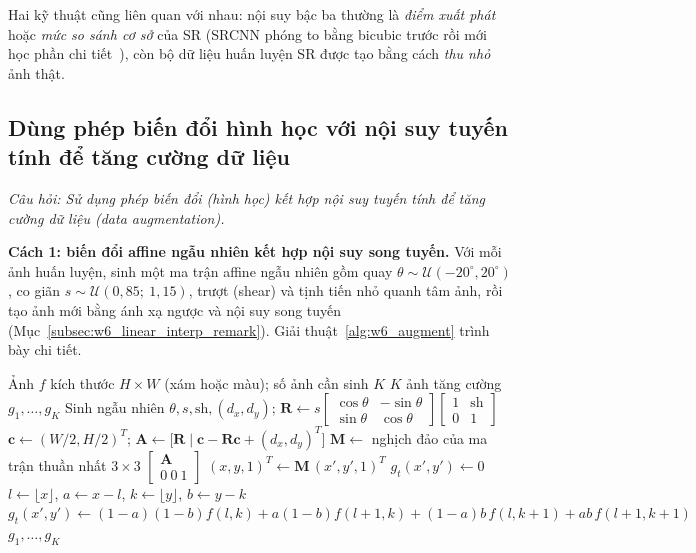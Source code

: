 Hai kỹ thuật cũng liên quan với nhau: nội suy bậc ba thường là \emph{điểm xuất phát} hoặc \emph{mức so sánh cơ sở} của SR (SRCNN phóng to bằng bicubic trước rồi mới học phần chi tiết~\citep{dong2016image}), còn bộ dữ liệu huấn luyện SR được tạo bằng cách \emph{thu nhỏ} ảnh thật.

\subsection{Dùng phép biến đổi hình học với nội suy tuyến tính để tăng cường dữ liệu}
\label{subsec:w6_augment_interp}

\textit{Câu hỏi: Sử dụng phép biến đổi (hình học) kết hợp nội suy tuyến tính để tăng cường dữ liệu (data augmentation).}

\textbf{Cách 1: biến đổi affine ngẫu nhiên kết hợp nội suy song tuyến.} Với mỗi ảnh huấn luyện, sinh một ma trận affine ngẫu nhiên gồm quay $\theta \sim \mathcal{U}(-20^\circ, 20^\circ)$, co giãn $s \sim \mathcal{U}(0{,}85;\ 1{,}15)$, trượt (shear) và tịnh tiến nhỏ quanh tâm ảnh, rồi tạo ảnh mới bằng ánh xạ ngược và nội suy song tuyến (Mục~\ref{subsec:w6_linear_interp_remark}). Giải thuật~\ref{alg:w6_augment} trình bày chi tiết.

\begin{algorithm}[ht]
\caption{Tăng cường dữ liệu bằng biến đổi affine ngẫu nhiên và nội suy song tuyến}
\label{alg:w6_augment}
\begin{algorithmic}[1]
\Require Ảnh $f$ kích thước $H \times W$ (xám hoặc màu); số ảnh cần sinh $K$
\Ensure $K$ ảnh tăng cường $g_1, \ldots, g_K$
    \State Sinh ngẫu nhiên $\theta, s, \text{sh}, (d_x, d_y)$; \quad $\mathbf{R} \gets s\begin{bmatrix}\cos\theta & -\sin\theta \\ \sin\theta & \cos\theta\end{bmatrix}\begin{bmatrix}1 & \text{sh} \\ 0 & 1\end{bmatrix}$
    \State $\mathbf{c} \gets (W/2, H/2)^T$; \quad $\mathbf{A} \gets \big[\mathbf{R} \mid \mathbf{c} - \mathbf{R}\mathbf{c} + (d_x, d_y)^T\big]$ 
    \State $\mathbf{M} \gets$ nghịch đảo của ma trận thuần nhất $3 \times 3$ $\begin{bmatrix}\mathbf{A} \\ 0\ 0\ 1\end{bmatrix}$
        \State $(x, y, 1)^T \gets \mathbf{M}\,(x', y', 1)^T$ 
         \State $g_t(x', y') \gets 0$ 
        \Else
            \State $l \gets \lfloor x \rfloor$, $a \gets x - l$, $k \gets \lfloor y \rfloor$, $b \gets y - k$
            \State $g_t(x', y') \gets (1 - a)(1 - b)f(l, k) + a(1 - b)f(l + 1, k) + (1 - a)b\,f(l, k + 1) + ab\,f(l + 1, k + 1)$
        \EndIf
    \EndFor
\EndFor
\State \Return $g_1, \ldots, g_K$
\end{algorithmic}
\end{algorithm}

